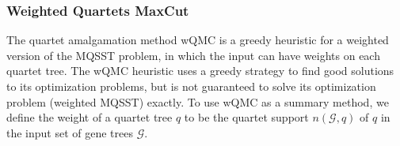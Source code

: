 \subsubsection{Weighted Quartets MaxCut}
The quartet amalgamation method 
wQMC \cite{wQMC} is 
a greedy heuristic for 
a weighted version of 
the MQSST problem, 
in which 
the input can have
weights on each quartet tree.
The
wQMC heuristic uses a greedy strategy to
find good solutions to its
optimization problems, but is not guaranteed to solve its
optimization problem (weighted MQSST) exactly. 
To use wQMC as a summary method, 
we define the weight of a quartet  tree $q$ to be 
the quartet support $n(\mathcal{G},q)$ of $q$ 
in the input set of gene trees $\mathcal{G}$. 
%
%
 
 

